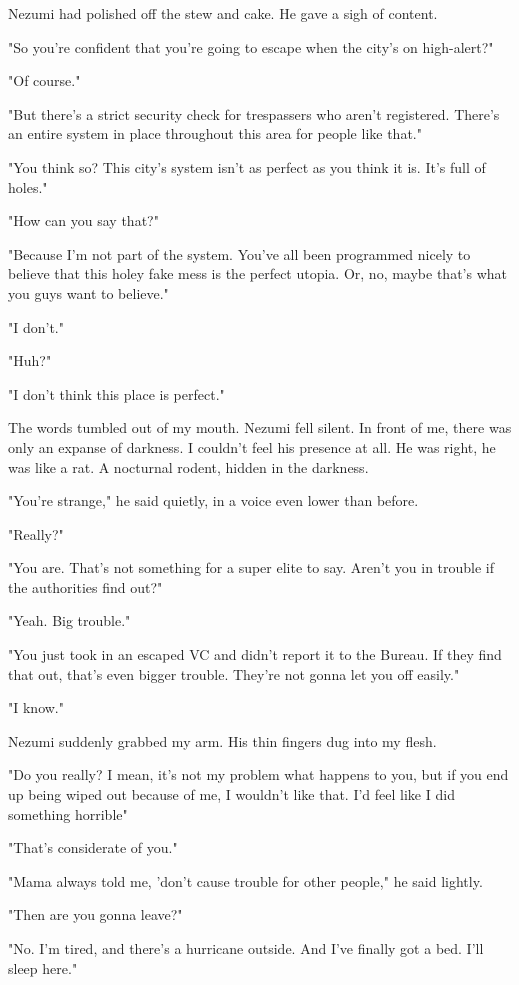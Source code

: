 Nezumi had polished off the stew and cake. He gave a sigh of content.

"So you're confident that you're going to escape when the city's on
high-alert?"

"Of course."

"But there's a strict security check for trespassers who aren't
registered. There's an entire system in place throughout this area for
people like that."

"You think so? This city's system isn't as perfect as you think it is.
It's full of holes."

"How can you say that?"

"Because I'm not part of the system. You've all been programmed nicely
to believe that this holey fake mess is the perfect utopia. Or, no,
maybe that's what you guys want to believe."

"I don't."

"Huh?"

"I don't think this place is perfect."

The words tumbled out of my mouth. Nezumi fell silent. In front of me,
there was only an expanse of darkness. I couldn't feel his presence at
all. He was right, he was like a rat. A nocturnal rodent, hidden in the
darkness.

"You're strange," he said quietly, in a voice even lower than before.

"Really?"

"You are. That's not something for a super elite to say. Aren't you in
trouble if the authorities find out?"

"Yeah. Big trouble."

"You just took in an escaped VC and didn't report it to the Bureau.
\el If they find that out, that's even bigger trouble. They're not gonna
let you off easily."

"I know."

Nezumi suddenly grabbed my arm. His thin fingers dug into my flesh.

"Do you really? I mean, it's not my problem what happens to you, but if
you end up being wiped out because of me, I wouldn't like that. I'd feel
like I did something horrible\el "

"That's considerate of you."

"Mama always told me, 'don't cause trouble for other people," he said
lightly.

"Then are you gonna leave?"

"No. I'm tired, and there's a hurricane outside. And I've finally got a
bed. I'll sleep here."

